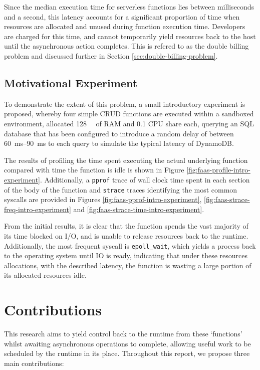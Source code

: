 Since the median execution time for serverless functions lies between milliseconds and a second\cite{eismannReviewServerlessUse2020}, this latency accounts for a significant proportion of time when resources are allocated and unused during function execution time. Developers are charged for this time, and cannot temporarily yield resources back to the host until the asynchronous action completes. This is refered to as the double billing problem\cite{baldiniServerlessTrilemmaFunction2017,yuCharacterizingServerlessPlatforms2020} and discussed further in Section \ref{sec:double-billing-problem}.

\subsection{Motivational Experiment}
To demonstrate the extent of this problem, a small introductory experiment is proposed, whereby four simple CRUD \faas{} functions are executed within a sandboxed environment, allocated \SI{128}{\mega\byte} of RAM and 0.1 CPU share each, querying an SQL database that has been configured to introduce a random delay of between \qtyrange{60}{90}{\ms} to each query to simulate the typical latency of DynamoDB.

The results of profiling the time spent executing the actual underlying function compared with time the function is idle is shown in Figure \ref{fig:faas-profile-intro-experiment}. Additionally, a \verb|pprof| trace of wall clock time spent in each section of the body of the function and \verb|strace| traces identifying the most common syscalls are provided in Figures \ref{fig:faas-pprof-intro-experiment},
\ref{fig:faas-strace-freq-intro-experiment} and \ref{fig:faas-strace-time-intro-experiment}.

From the initial results, it is clear that the function spends the vast majority of its time blocked on I/O, and is unable to release resources back to the runtime. Additionally, the most frequent syscall is \verb|epoll_wait|, which yields a process back to the operating system until IO is ready, indicating that under these resources allocations, with the described latency, the function is wasting a large portion of its allocated resources idle.

\section{Contributions}

This research aims to yield control back to the runtime from these `functions' whilst awaiting asynchronous operations to complete, allowing useful work to be scheduled by the runtime in its place. Throughout this report, we propose three main contributions:

